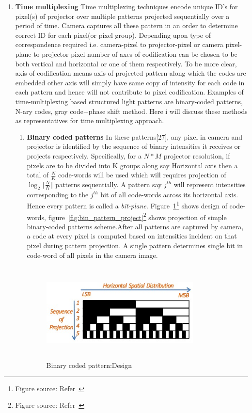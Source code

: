 \begin{enumerate}
\item \textbf{Time multiplexing}\newline    
\noindent 
Time multiplexing techniques encode unique ID's for pixel(s) of projector over multiple patterns projected sequentially over a period of time. Camera captures all these pattern in an order to determine correct ID for each pixel(or pixel group). Depending upon type of correspondence required i.e. camera-pixel to projector-pixel or camera pixel-plane to projector pixel-number of axes of codification can be chosen to be both vertical and horizontal or one of them respectively. To be more clear, axis of codification means axis of projected pattern along which the codes are embedded other axis will simply have same copy of intensity for each code in each pattern and hence will not contribute to pixel codification. Examples of time-multiplexing based structured light patterns are binary-coded patterns, N-ary codes, gray code+phase shift method. Here i will discuss these methods as representatives for time multiplexing approach.
\begin{enumerate}
\item \textbf{Binary coded patterns} \newline
\noindent
In these patterns[27], any pixel in camera and projector is identified by the sequence of binary intensities it receives or projects respectively. Specifically, for a $N*M$ projector resolution, if pixels are to be divided into K groups along say Horizontal axis then a total of $\frac{N}{K}$ code-words will be used which will requires projection of $\log_2\lceil\frac{N}{K}\rceil$ patterns sequentially. A pattern say $j^{th}$ will represent intensities corresponding to the $j^{th}$ bit of all code-words across its horizontal axis. Hence every pattern is called a \textit{bit-plane}. Figure~\ref{fig:bin_pattern_design}\footnote{Figure source: Refer~\cite{25}} shows design of code-words, figure~\ref{fig:bin_pattern_project}\footnote{Figure source: Refer~\cite{25}} shows projection of simple binary-coded patterns scheme.After all patterns are captured by camera, a code at every pixel is computed based on intensities incident on that pixel during pattern projection. A single pattern determines single bit in code-word of all pixels in the camera image.
  

\begin{figure}
\centering
\includegraphics[width=8cm,height=5cm]{../img_source/coded_pattern_design.jpg}
\caption{Binary coded pattern:Design}
\label{fig:bin_pattern_design}
\end{figure}


\end{enumerate}
\end{enumerate}
